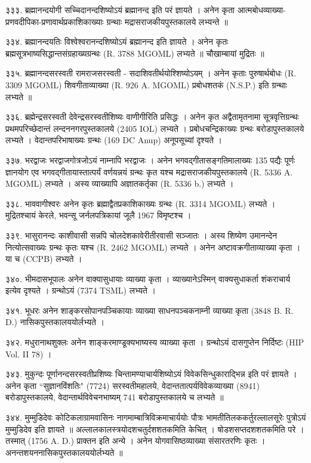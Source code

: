 ३३३. ब्रह्मानन्दयोगी
सच्चिदानन्दशिष्योऽयं ब्रह्मानन्द इति परं ज्ञायते । अनेन कृता आत्मबोधव्याख्या-प्रणवदीपिका-प्रणावार्थप्रकाशिकाख्याः ग्रन्थाः मद्रासराजकीयपुस्तकालये लभ्यन्ते ॥

३३४. ब्रह्मानन्दयतिः
विश्वेश्वरानन्दशिष्योऽयं ब्रह्मानन्द इति ज्ञायते । अनेन कृतः ब्रह्मसूत्रभाष्यसिद्धान्तसंग्रहाख्यग्रन्थः (R. 3788 MGOML) लभ्यते ॥ चौखाम्बायां मुद्रितः ॥

३३५. ब्रह्मानन्दसरस्वती
रामराजसरस्वती - सदाशिवतीर्थयोश्शिष्योऽयम् । अनेन कृताः पुरुषार्थबोधः (R. 3309 MGOML) शिवगीताव्याख्या (R. 926 A. MGOML) प्रबोधशतकं (N.S.P.) इति ग्रन्थाः लभ्यते ॥

३३६. ब्रह्मेन्द्रसरस्वती
देवेन्द्रसरस्वतीशिष्यः वाणीगीरिति प्रसिद्धः । अनेन कृत अद्वैतामृतनामा सूत्रवृत्तिग्रन्थः प्रथमपरिच्छेदान्तं लन्दननगरपुस्तकालये (2405 IOL) लभ्यते । प्रबोधचन्द्रिकाख्यः ग्रन्थः बरोडापुस्तकालये लभ्यते । वेदान्तपरिभाषाख्यः ग्रन्थः (169 DC Anup) अनूपसूच्यां दृश्यते ।

३३७. भरद्वाजः
भरद्वाजगोत्रजोऽयं नाम्नापि भरद्वाजः । अनेन भगवद्गीतासङ्गतिमालाख्यः 135 पद्यैः पूर्णः ज्ञानयोग एव भगवद्गीतायास्तात्पर्यं वर्णयन्नयं ग्रन्थः कृत यश्च मद्रासराजकीयपुस्तकालये (R. 5336 A. MGOML) लभ्यते । अस्य व्याख्यापि अज्ञातकर्तृका (R. 5336 b.) लभ्यते ।

३३८. भाववागीश्वरः
अनेन कृतः ब्रह्माद्वैतप्रकाशिकाख्यः ग्रन्थः (R. 3314 MGOML) लभ्यते । मुद्रितश्चायं केरले, भवन्सू जर्नलपत्रिकायां जूलै 1967 विमृष्टश्च ।

३३९. भासुरानन्दः
काशीवासी सन्नपि चोलदेशकावेरीतीरवासी सञ्जातः । अस्य शिष्येण उमानन्देन नित्योत्सवाख्यः ग्रन्थः कृतः यश्च (R. 2462 MGOML) लभ्यते । अनेन अष्टावक्रगीताव्याख्या कृता । या च (CCPB) लभ्यते ।

३४०. भीमदासभूपालः
अनेन वाक्यासुधायाः व्याख्या कृता । व्याख्यानेऽस्मिन् वाक्यसुधाकर्ता शंकराचार्य इत्येव दृश्यते । ग्रन्थोऽयं (7374 TSML) लभ्यते ।

३४१. भूधरः
अनेन शाङ्करसोपानपञ्चिकायाः व्याख्या साधनपञ्चकनाम्नी व्याख्या कृता (3848 B. R. D.) नासिकपुस्तकालययोर्लभ्यते ।

३४२. मधुरानाथशुक्लः
अनेन शाङ्करमाण्डूक्यभाष्यस्य व्याख्या कृता । ग्रन्थोऽयं दासगुप्तेन निर्दिष्टः (HIP Vol. II 78) ।

३४३. मुकुन्दः
पूर्णानन्दसरस्वतीप्रशिष्यः चिन्तामण्याचार्यशिष्योऽयं विवेकसिन्धुकाराद्भिन्न इति परं ज्ञायते । अनेन कृता ``सुज्ञानविंशतिः" (7724) सरस्वतीमहालये, वेदान्ततात्पर्यविवेकव्याख्या (8941) बरोडापुस्तकालये, वेदान्तार्थविवेचनभाष्यम् 741 बरोडापुस्तकालये च लभ्यते ॥

३४४. मुम्मुडिदेवः
कोटिकलाग्रामवासिनः नागमाम्बात्रिविक्रमाचार्ययोः पौत्रः भामतीतिलककर्तुरल्लालसूरेः पुत्रोऽयं मुम्मुडिदेव इति ज्ञायते ॥ अल्लालकालस्त्रयोदशचतुर्दशशतकमिति केचित् । षोडशसप्तदशशतकमिति परे । तस्मात् (1756 A. D.) प्राक्तन इति अन्ये । अनेन योगवासिष्ठव्याख्या संसारतरणिः कृतः । अनन्तशयननासिकपुस्तकालययोर्लभ्यते ॥

